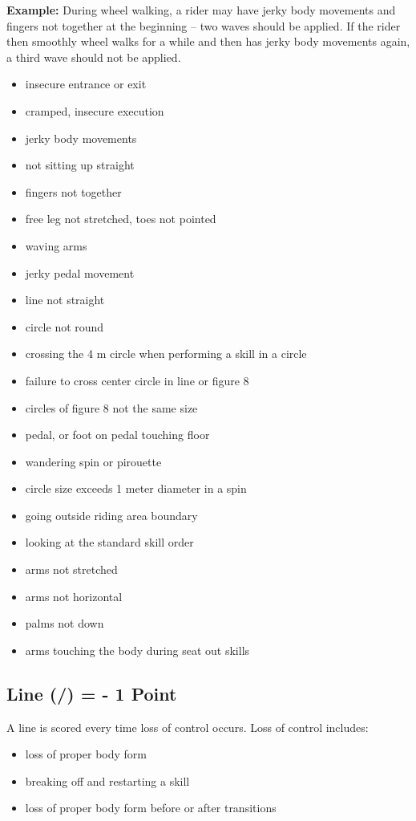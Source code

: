 \textbf{Example:} During wheel walking, a rider may have jerky body movements and fingers not together at the beginning – two waves should be applied.
If the rider then smoothly wheel walks for a while and then has jerky body movements again, a third wave should not be applied.
\begin{itemize}
\item insecure entrance or exit 
\item cramped, insecure execution 
\item jerky body movements 
\item not sitting up straight 
\item fingers not together 
\item free leg not stretched, toes not pointed 
\item waving arms 
\item jerky pedal movement 
\item line not straight 
\item circle not round 
\item crossing the 4 m circle when performing a skill in a circle 
\item failure to cross center circle in line or figure 8 
\item circles of figure 8 not the same size 
\item pedal, or foot on pedal touching floor 
\item wandering spin or pirouette 
\item circle size exceeds 1 meter diameter in a spin 
\item going outside riding area boundary 
\item looking at the standard skill order 
\item arms not stretched 
\item arms not horizontal 
\item palms not down 
\item arms touching the body during seat out skills
\end{itemize}

\subsection{Line (/) = - 1 Point}
A line is scored every time loss of control occurs.
Loss of control includes:
\begin{itemize}
\item loss of proper body form 
\item breaking off and restarting a skill 
\item loss of proper body form before or after transitions
\end{itemize}

